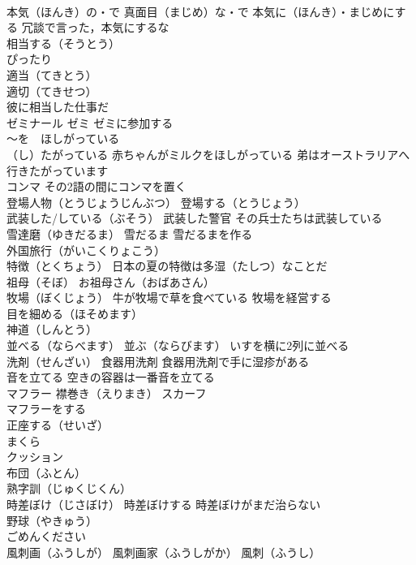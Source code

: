 \documentclass[8pt]{extreport}
\begin{document}
\begin{CJK}{UTF8}{min}
\\	本気（ほんき）の・で 真面目（まじめ）な・で 本気に（ほんき）・まじめにする 冗談で言った，本気にするな
\\	相当する（そうとう） 
\\	ぴったり 
\\	適当（てきとう）
\\	適切（てきせつ）
\\	彼に相当した仕事だ
\\	ゼミナール ゼミ ゼミに参加する
\\	～を　ほしがっている 
\\	（し）たがっている 赤ちゃんがミルクをほしがっている 弟はオーストラリアへ行きたがっています
\\	コンマ その2語の間にコンマを置く
\\	登場人物（とうじょうじんぶつ） 登場する（とうじょう）
\\	武装した/している（ぶそう） 武装した警官 その兵士たちは武装している
\\	雪達磨（ゆきだるま） 雪だるま 雪だるまを作る
\\	外国旅行（がいこくりょこう）
\\	特徴（とくちょう） 日本の夏の特徴は多湿（たしつ）なことだ
\\	祖母（そぼ） お祖母さん（おばあさん）
\\	牧場（ぼくじょう） 牛が牧場で草を食べている 牧場を経営する
\\	目を細める（ほそめます）
\\	神道（しんとう）
\\	並べる（ならべます） 並ぶ（ならびます） いすを横に2列に並べる
\\	洗剤（せんざい） 食器用洗剤 食器用洗剤で手に湿疹がある
\\	音を立てる 空きの容器は一番音を立てる
\\	マフラー 襟巻き（えりまき） スカーフ 
\\	マフラーをする
\\	正座する（せいざ）
\\	まくら 
\\	クッション 
\\	布団（ふとん） 
\\	熟字訓（じゅくじくん）
\\	時差ぼけ（じさぼけ） 時差ぼけする 時差ぼけがまだ治らない
\\	野球（やきゅう）
\\	ごめんください
\\	風刺画（ふうしが） 風刺画家（ふうしがか） 風刺（ふうし）

\end{CJK}
\end{document}
